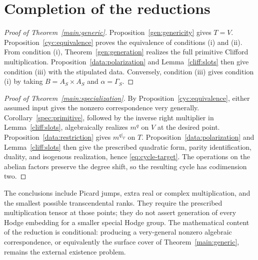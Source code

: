 \section{Completion of the reductions}\label{sec:conclusion}

\begin{proof}[Proof of Theorem~\ref{main:generic}]
Proposition~\ref{gen:genericity} gives $T=V$.
Proposition~\ref{cyc:equivalence} proves the equivalence of
conditions \textup{(i)} and \textup{(ii)}.
From condition \textup{(i)}, Theorem~\ref{gen:generation}
realizes the full primitive Clifford multiplication.
Proposition~\ref{data:polarization} and
Lemma~\ref{cliff:slots} then give condition \textup{(iii)}
with the stipulated data.
Conversely, condition \textup{(iii)} gives condition \textup{(i)}
by taking $B=A_S\times A_S$ and $\alpha=\Gamma_S$.
\end{proof}

\begin{proof}[Proof of Theorem~\ref{main:specialization}]
By Proposition~\ref{cyc:equivalence}, either assumed input gives
the nonzero correspondence very generally.
Corollary~\ref{spec:primitive}, followed by the inverse right
multiplier in Lemma~\ref{cliff:slots}, algebraically realizes
$m^q$ on $V$ at the desired point.
Proposition~\ref{data:restriction} gives $m^{q|_T}$ on $T$.
Proposition~\ref{data:polarization} and
Lemma~\ref{cliff:slots} then give the prescribed quadratic form,
parity identification, duality, and isogenous realization,
hence \eqref{eq:cycle-target}.
The operations on the abelian factors preserve the degree shift,
so the resulting cycle has codimension two.
\end{proof}

The conclusions include Picard jumps, extra real or complex multiplication, and the smallest possible transcendental ranks. They require the prescribed multiplication tensor at those points; they do not assert generation of every Hodge embedding for a smaller special Hodge group. The mathematical content of the reduction is conditional: producing a very-general nonzero algebraic correspondence, or equivalently the surface cover of Theorem~\ref{main:generic}, remains the external existence problem.
